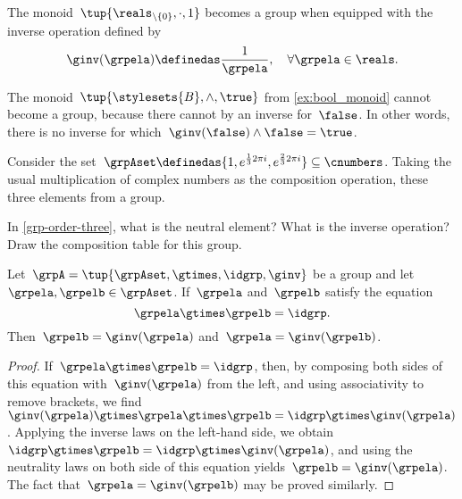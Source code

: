 \begin{example}
  The monoid~$\tup{\reals_{\backslash \{ 0 \}}, \cdot, 1}$ becomes a group when equipped with the inverse operation defined by
  \begin{equation}
    \ginv(\grpela) \definedas \frac{1}{\grpela}, \quad \forall \grpela \in \reals.
  \end{equation}
\end{example}
\begin{example}
  The monoid~$\tup{\stylesets{B},\wedge, \true}$ from \cref{ex:bool_monoid} cannot become a group, because there cannot by an inverse for~$\false$.
  In other words, there is no inverse for which~$\ginv(\false)\wedge \false=\true$.
\end{example}
\begin{example}
  \label{grp-order-three}
  Consider the set~$\grpAset \definedas \{ 1, e^{\frac{1}{3}2\pi i}, e^{\frac{2 }{3}2\pi i}  \} \subseteq \cnumbers$.
  Taking the usual multiplication of complex numbers as the composition operation, these three elements from a group.
\end{example}

\begin{gradedexercise}\label{ex:GroupWithThreeElements}
  In \cref{grp-order-three}, what is the neutral element? What is the inverse operation?
  Draw the composition table for this group.
\end{gradedexercise}


\begin{lemma}
 \label{lem:inv-op-unique}
Let~$\grpA = \tup{ \grpAset, \gtimes, \idgrp, \ginv }$ be a group and let~$\grpela, \grpelb \in \grpAset$. If~$\grpela$ and~$\grpelb$ satisfy the equation
\begin{equation}
\grpela \gtimes \grpelb = \idgrp.
\end{equation}
Then~$\grpelb = \ginv( \grpela )$ and~$\grpela = \ginv(\grpelb)$.
\end{lemma}

\begin{proof}
If~$\grpela \gtimes \grpelb = \idgrp$, then, by composing both sides of this equation with~$\ginv(\grpela)$ from the left, and using associativity to remove brackets, we find~$\ginv(\grpela) \gtimes \grpela \gtimes \grpelb = \idgrp \gtimes \ginv(\grpela)$.
Applying the inverse laws on the left-hand side, we obtain~$\idgrp \gtimes \grpelb = \idgrp \gtimes \ginv(\grpela)$, and using the neutrality laws on both side of this equation yields~$\grpelb =  \ginv(\grpela)$.
The fact that~$\grpela = \ginv(\grpelb)$ may be proved similarly.
\end{proof}


